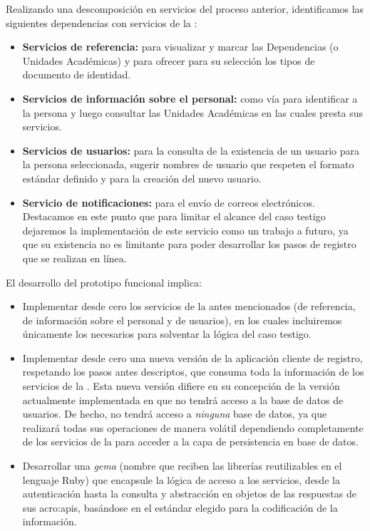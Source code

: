 Realizando una descomposición en servicios del proceso anterior, identificamos las siguientes dependencias con servicios de la \cloud:

\begin{itemize}
  \item \textbf{Servicios de referencia:} para visualizar y marcar las Dependencias (o Unidades Académicas) y para ofrecer para su selección los tipos de documento de identidad.

  \item \textbf{Servicios de información sobre el personal:} como vía para identificar a la persona y luego consultar las Unidades Académicas en las cuales presta sus servicios.

  \item \textbf{Servicios de usuarios:} para la consulta de la existencia de un usuario para la persona seleccionada, sugerir nombres de usuario que respeten el formato estándar definido y para la creación del nuevo usuario.

  \item \textbf{Servicio de notificaciones:} para el envío de correos electrónicos. Destacamos en este punto que para limitar el alcance del caso testigo dejaremos la implementación de este servicio como un trabajo a futuro, ya que su existencia no es limitante para poder desarrollar los pasos de registro que se realizan en línea.
\end{itemize}

El desarrollo del prototipo funcional implica:

\begin{itemize}
  \item Implementar desde cero los servicios de la \cloud antes mencionados (de referencia, de información sobre el personal y de usuarios), en los cuales incluiremos únicamente los  necesarios para solventar la lógica del caso testigo.

  \item Implementar desde cero una nueva versión de la aplicación cliente de registro, respetando los pasos antes descriptos, que consuma toda la información de los servicios de la \cloud. Esta nueva versión difiere en su concepción de la versión actualmente implementada en que no tendrá acceso a la base de datos de usuarios. De hecho, no tendrá acceso a \textit{ninguna} base de datos, ya que realizará todas sus operaciones de manera volátil dependiendo completamente de los servicios de la \cloud para acceder a la capa de persistencia en base de datos.

  \item Desarrollar una \textit{gema} (nombre que reciben las librerías reutilizables en el lenguaje Ruby) que encapsule la lógica de acceso a los servicios, desde la autenticación hasta la consulta y abstracción en objetos de las respuestas de sus \glspl{acro:api}, basándose en el estándar elegido para la codificación de la información.
\end{itemize}

